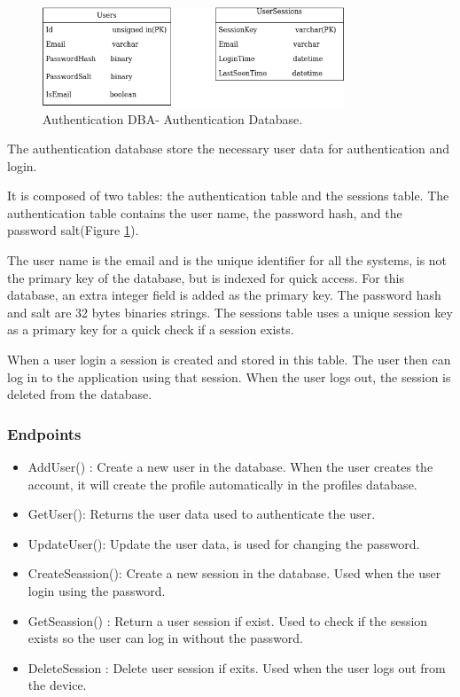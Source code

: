 \begin{figure}
\begin{center}
\includegraphics[width=90mm,scale=1]{img/auth/auth-db.png}
\caption{Authentication DBA- Authentication Database.}
\label{auth:authdbuml}
\end{center}

\end{figure}

\indent
\indent
The authentication database store the necessary user data for authentication and login.

 It is composed of two tables: the authentication table and the sessions table. The authentication table contains the user name, the password hash, and the password salt(Figure \ref{auth:authdbuml}).
 
  The user name is the email and is the unique identifier for all the systems, is not the primary key of the database, but is indexed for quick access. For this database, an extra integer field is added as the primary key. The password hash and salt are 32 bytes binaries strings. The sessions table uses a unique session key as a primary key for a quick check if a session exists. 
  
  When a user login a session is created and stored in this table. The user then can log in to the application using that session. When the user logs out, the session is deleted from the database.


\subsubsection{Endpoints}
\begin{itemize}
\item AddUser() : Create a new user in the database. When the user creates the account, it will create the profile automatically in the profiles database.

\item GetUser(): Returns the user data used to authenticate the user.

\item UpdateUser(): Update the user data, is used for changing the password.

\item CreateSeassion(): Create a new session in the database. Used when the user login  using the password.

\item GetSeassion() : Return a user session if exist. Used to check if the session exists so the user can log in without the password.

\item DeleteSession : Delete user session if exits. Used when the user logs out from the device.

\end{itemize}

